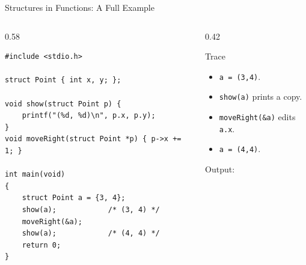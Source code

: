 \documentclass[aspectratio=169]{beamer}
\begin{document}
	\begin{frame}[fragile]{Structures in Functions: A Full Example}
		\begin{columns}[T]
			\begin{column}{0.58\textwidth}
				\begin{lstlisting}
#include <stdio.h>

struct Point { int x, y; };

void show(struct Point p) {
    printf("(%d, %d)\n", p.x, p.y);
}
void moveRight(struct Point *p) { p->x += 1; }

int main(void)
{
    struct Point a = {3, 4};
    show(a);            /* (3, 4) */
    moveRight(&a);
    show(a);            /* (4, 4) */
    return 0;
}
				\end{lstlisting}
			\end{column}
			\begin{column}{0.42\textwidth}
				\begin{block}{Trace}
					\small
					\begin{itemize}
						\item \texttt{a = (3,4)}.
						\item \texttt{show(a)} prints a copy.
						\item \texttt{moveRight(\&a)} edits \texttt{a.x}.
						\item \texttt{a = (4,4)}.
					\end{itemize}
				\end{block}
				\centering\footnotesize Output:\; 
			\end{column}
		\end{columns}
	\end{frame}

\end{document}

